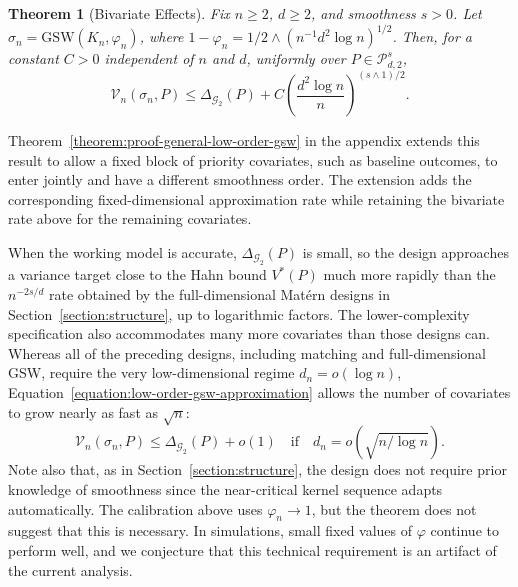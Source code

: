 \documentclass[letterpaper,12pt]{article}
\newtheorem{thm}{Theorem}[section]
\theoremstyle{definition}
\numberwithin{equation}{section}
\newcommand{\mc}{\mathcal}
\begin{document}
\begin{thm}[Bivariate Effects]\label{theorem:low-order-gsw}
Fix $n\geq2$, $d\geq2$, and smoothness $s>0$.
Let $\sigma_n=\mathrm{GSW}(K_n,\varphi_n)$, where $1-\varphi_n=1/2\wedge(n^{-1}d^2\log n)^{1/2}$.
Then, for a constant $C>0$ independent of $n$ and $d$, uniformly over $P\in\mc P_{d,2}^{s}$,
\begin{equation}\label{equation:low-order-gsw-approximation}
\mc V_n(\sigma_n,P)\leq\Delta_{\mc G_2}(P)+C\left(\frac{d^2\log n}{n}\right)^{(s\wedge1)/2}.
\end{equation}
\end{thm}

Theorem~\ref{theorem:proof-general-low-order-gsw} in the appendix extends this result to allow a fixed block of priority covariates, such as baseline outcomes, to enter jointly and have a different smoothness order.
The extension adds the corresponding fixed-dimensional approximation rate while retaining the bivariate rate above for the remaining covariates.

When the working model is accurate, $\Delta_{\mc G_2}(P)$ is small, so the design approaches a variance target close to the Hahn bound $V^*(P)$ much more rapidly than the $n^{-2s/d}$ rate obtained by the full-dimensional Mat\'ern designs in Section~\ref{section:structure}, up to logarithmic factors.
The lower-complexity specification also accommodates many more covariates than those designs can.
Whereas all of the preceding designs, including matching and full-dimensional GSW, require the very low-dimensional regime $d_n=o(\log n)$, Equation~\eqref{equation:low-order-gsw-approximation} allows the number of covariates to grow nearly as fast as $\sqrt n$:
\begin{equation*}
\mc V_n(\sigma_n,P)\leq\Delta_{\mc G_2}(P)+o(1)\quad\text{if}\quad d_n=o(\sqrt{n/\log n}).
\end{equation*}
Note also that, as in Section~\ref{section:structure}, the design does not require prior knowledge of smoothness since the near-critical kernel sequence adapts automatically.
The calibration above uses $\varphi_n\to1$, but the theorem does not suggest that this is necessary.
In simulations, small fixed values of $\varphi$ continue to perform well, and we conjecture that this technical requirement is an artifact of the current analysis.
\end{document}
